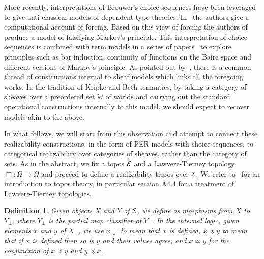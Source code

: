 \documentclass{easychair}
\newtheorem{defn}[thrm]{Definition}
\begin{document}
More recently, interpretations of Brouwer's choice sequences have been leveraged
to give anti-classical models of dependent type theories.
%
In~\cite{coquandComputationalInterpretationForcing2012} the authors give a
computational account of forcing.
%
Based on this view of forcing the authors
of~\cite{coquandIndependenceMarkovsPrinciple2016} produce a model of \MLTT{}
falsifying Markov's principle.
%
This interpretation of choice sequences is combined with term models in a series
of papers~\cite{bickfordComputabilityChurchTuringChoice2018,
  bickfordOpenBarBrouwerian2021, cohenSeparatingMarkovsPrinciples2024,
  rahliValidatingBrouwersContinuity2018, forsterMarkovsPrinciplesConstructive}
to explore principles such as bar induction, continuity of functions on the
Baire space and different versions of Markov's principle.
%
As pointed out by~\cite{sterlingHigherOrderFunctions2021}, there is a common
thread of constructions internal to sheaf models which links all the foregoing
works.
%
In the tradition of Kripke and Beth semantics, by taking a category of
sheaves over a preordered set \(\mathbb{W}\) of worlds and carrying out
the standard operational constructions internally to this model, we should
expect to recover models akin to the above.

In what follows, we will start from this observation and attempt to connect these
realizability constructions, in the form of PER models with choice sequences, to
categorical realizability over categories of sheaves, rather than the category of
sets.
%
As in the abstract, we fix a topos \(\mathcal{E}\) and a Lawvere-Tierney topology
\(\Box : \Omega \to \Omega\) and proceed to define a realizability tripos over
\(\mathcal{E}\).
%
We refer to~\cite{johnstoneSketchesElephantTopos2002} for an introduction to
topos theory, in particular section A4.4 for a treatment of Lawvere-Tierney
topologies.

\begin{defn}
  Given objects \(X\) and \(Y\) of \(\mathcal{E}\), we define
   as morphisms
  from \(X\) to \(Y_{\bot}\), where \(Y_{\bot}\) is the partial map classifier
  of \(Y\)~\cite[\S A2.4]{johnstoneSketchesElephantTopos2002}.
  In the internal logic, given elements \(x\) and \(y\) of \(X_{\bot}\), we use
  \(x \downarrow\) to mean that \(x\) is defined, \(x \preccurlyeq y\) to mean
  that if \(x\) is defined then so is \(y\) and their values agree, and
  \(x \simeq y\) for the conjunction of \(x \preccurlyeq y\) and
  \(y \preccurlyeq x\).
\end{defn}
\end{document}

